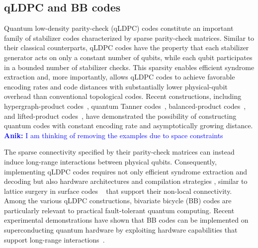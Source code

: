 \documentclass[sigconf]{acmart}
\newcommand{\anik}[1]{%
        \textcolor{blue}{\textbf{Anik:} #1}%
    }
\newcommand{\siyi}[1]{%
        \textcolor{cyan}{\textbf{Siyi:} #1}%
    }
\newcommand{\anik}[1]{}
\newcommand{\siyi}[1]{}
\begin{document}
%
\subsection{qLDPC and BB codes}
Quantum low-density parity-check (qLDPC) codes constitute an important family of stabilizer codes characterized by sparse parity-check matrices. Similar to their classical counterparts, qLDPC codes have the property that each stabilizer generator acts on only a constant number of qubits, while each qubit participates in a bounded number of stabilizer checks. This sparsity enables efficient syndrome extraction and, more importantly, allows qLDPC codes to achieve favorable encoding rates and code distances with substantially lower physical-qubit overhead than conventional topological codes. Recent constructions, including hypergraph-product codes~\cite{tillich2013tit}, quantum Tanner codes~\cite{leverrier2022focs}, balanced-product codes~\cite{bpqc2021}, and lifted-product codes~\cite{lpqc}, have demonstrated the possibility of constructing quantum codes with constant encoding rate and asymptotically growing distance.
\anik{I am thinking of removing the examples due to space constraints}

The sparse connectivity specified by their parity-check matrices can instead induce long-range interactions between physical qubits. Consequently, implementing qLDPC codes requires not only efficient syndrome extraction and decoding but also hardware architectures \cite{wang2025nature} and compilation strategies \cite{tourdegross}, similar to lattice surgery in surface codes ~\cite{gameofsurfacecodes,leblond2024realistic} that support their non-local connectivity. Among the various qLDPC constructions, bivariate bicycle (BB) codes are particularly relevant to practical fault-tolerant quantum computing. Recent experimental demonstrations have shown that BB codes can be implemented on superconducting quantum hardware by exploiting hardware capabilities that support long-range interactions~\cite{bravyi2024highthreshold}.
\end{document}

